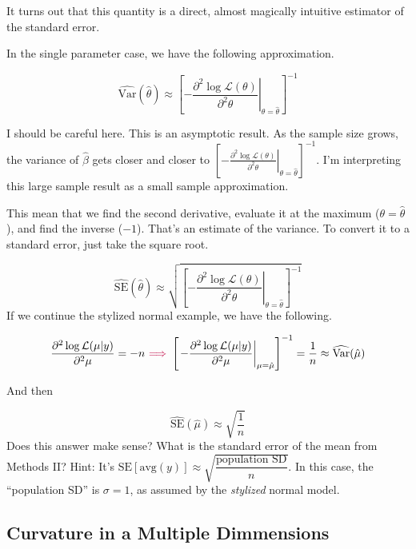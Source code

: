 \documentclass[
]{book}
\begin{document}
It turns out that this quantity is a direct, almost magically intuitive
estimator of the standard error.

In the single parameter case, we have the following approximation.

\[
\widehat{\text{Var}}(\hat{\theta}) \approx \left[\left. - \frac{\partial^2 \log \mathcal{L}(\theta)}{\partial^2 \theta}\right| _{\theta = \hat{\theta}}\right] ^{-1}
\]

I should be careful here. This is an asymptotic result. As the sample
size grows, the variance of \(\hat{\beta}\) gets closer and closer to
\(\left[\left. - \frac{\partial^2 \log \mathcal{L}(\theta)}{\partial^2 \theta}\right| _{\theta = \hat{\theta}}\right] ^{-1}\).
I'm interpreting this large sample result as a small sample
approximation.

This mean that we find the second derivative, evaluate it at the maximum
(\(\theta = \hat{\theta}\)), and find the inverse (\(-1\)). That's an
estimate of the variance. To convert it to a standard error, just take
the square root.

\[
\widehat{\text{SE}}(\hat{\theta}) \approx \sqrt{\left[\left. - \frac{\partial^2 \log \mathcal{L}(\theta)}{\partial^2 \theta}\right| _{\theta = \hat{\theta}}\right] ^{-1}}
\] If we continue the stylized normal example, we have the following.

\[
\begin{equation*}
\dfrac{\partial^2 \log \mathcal{L}(\mu | y)}{\partial^2 \mu} =  - n
 ~{\color{purple}{\Longrightarrow}}~
\left[\left. - \frac{\partial^2 \log \mathcal{L}(\mu | y)}{\partial^2 \mu}\right| _{\mu = \hat{\mu}}\right] ^{-1} 
 = \dfrac{1}{n} 
\approx \widehat{\text{Var}}(\hat{\mu})
\end{equation*}
\]

And then

\[
\begin{equation*}
\widehat{\text{SE}}(\hat{\mu}) \approx \sqrt{\dfrac{1}{n}} 
\end{equation*}
\] Does this answer make sense? What is the standard error of the mean
from Methods II? Hint: It's
\(\text{SE}[\text{avg}(y)] \approx \sqrt{\dfrac{\text{population SD}}{n}}\).
In this case, the ``population SD'' is \(\sigma = 1\), as assumed by the
\emph{stylized} normal model.

\hypertarget{curvature-in-a-multiple-dimmensions}{%
\subsection{Curvature in a Multiple
Dimmensions}\label{curvature-in-a-multiple-dimmensions}}
\end{document}
